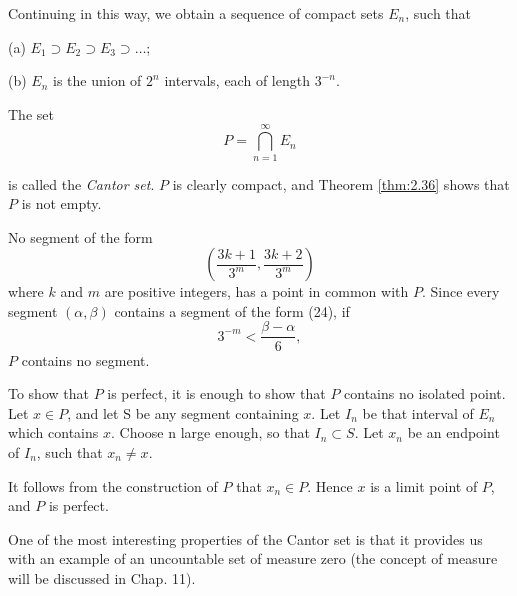 Continuing in this way, we obtain a sequence of compact sets $E_n$, such that

(a) $E_1 \supset E_2 \supset E_3 \supset \dots$;

(b) $E_n$ is the union of $2^n$ intervals, each of length $3^{-n}$.

The set
\begin{equation*}
    P = \bigcap_{n=1}^{\infty} E_n
\end{equation*}

is called the \emph{Cantor set}. $P$ is clearly compact, and Theorem \ref{thm:2.36} shows that $P$ is not empty.

No segment of the form
\begin{equation}
    \left(
        \frac{3k+1}{3^m},
        \frac{3k+2}{3^m}
    \right)
\end{equation}
where $k$ and $m$ are positive integers, has a point in common with $P$. Since every segment $(\alpha, \beta)$ contains a segment of the form (24), if
\begin{equation*}
    3^{-m} < \frac{\beta - \alpha}{6},
\end{equation*}
$P$ contains no segment.

To show that $P$ is perfect, it is enough to show that $P$ contains no isolated point. Let $x \in P$, and let S be any segment containing $x$. Let $I_n$ be that interval of $E_n$ which contains $x$. Choose n large enough, so that $I_n \subset S$. Let $x_n$ be an endpoint of $I_n$, such that $x_n \neq x$.

It follows from the construction of $P$ that $x_n \in P$. Hence $x$ is a limit point of $P$, and $P$ is perfect.

One of the most interesting properties of the Cantor set is that it provides
us with an example of an uncountable set of measure zero (the concept of
measure will be discussed in Chap. 11).
